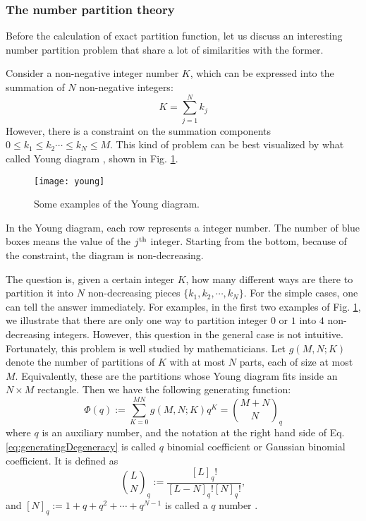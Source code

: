 \subsubsection{The number partition theory}
\label{ssub:The Number Partition Theory}
Before the calculation of exact partition function, let us discuss an interesting number partition problem that share a lot of similarities with the former. 

Consider a non-negative integer number $K$, which can be expressed into the summation of $N$ non-negative integers:
\begin{equation}
    K = \sum_{j=1}^N k_j
\end{equation}
However, there is a constraint on the summation components $0 \leqslant k_1 \leqslant k_2 \cdots \leqslant k_N \leqslant M$. This kind of problem can be best visualized by what called Young diagram \cite{Andrews1998}, shown in Fig. \ref{fig:young}.
\begin{figure}[htpb]
    \centering
    \texttt{[image: young]}
    \caption{Some examples of the Young diagram.}
    \label{fig:young}
\end{figure}
In the Young diagram, each row represents a integer number. The number of blue boxes means the value of the $j^{\rm{th}}$ integer. Starting from the bottom, because of the constraint, the diagram is non-decreasing. 

The question is, given a certain integer $K$, how many different ways are there to partition it into $N$ non-decreasing pieces $\{k_1, k_2, \cdots, k_N\}$. For the simple cases, one can tell the answer immediately. For examples, in the first two examples of Fig. \ref{fig:young}, we illustrate that there are only one way to partition integer $0$ or $1$ into $4$ non-decreasing integers. However, this question in the general case is not intuitive. Fortunately, this problem is well studied by mathematicians. Let $g(M, N; K)$ denote the number of partitions of $K$ with at most $N$ parts, each of size at most $M$. Equivalently, these are the partitions whose Young diagram fits inside an $N \times M$ rectangle. Then we have the following generating function:
\begin{equation}
    \label{eq:generatingDegeneracy}
    \Phi(q):=\sum_{K=0}^{MN} g(M, N; K) q^K = \binom{M+N}{N}_q
\end{equation}
where $q$ is an auxiliary number, and the notation at the right hand side of Eq. \eqref{eq:generatingDegeneracy} is called $q$ binomial coefficient or Gaussian binomial coefficient. It is defined as 
\begin{equation}
    \label{eq:qBinomial}
    \binom{L}{N}_q := \frac{[L]_q!}{[L-N]_q![N]_q!},
\end{equation}
and $[N]_q := 1 + q + q^2 + \cdots + q^{N-1}$ is called a $q$ number \cite{Andrews1998}.


